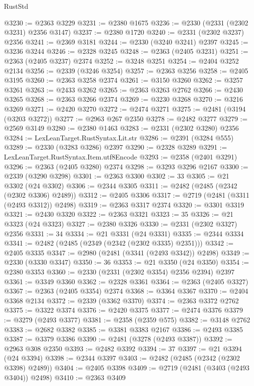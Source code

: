\begin{lexlean}{RustStd}
\begin{coremodule}
@3230 := @2363 @3229
@3231 := @2380 @1675
@3236 := @2330 (@2331 (@2302 @3231) @2356 @3147)
@3237 := @2380 @1720
@3240 := @2331 (@2302 @3237) @2356
@3241 := @2369 @3181
@3244 := @2330 (@3240 @3241) @2397
@3245 := @3236 @3244
@3246 := @2328 @3245
@3248 := @2363 (@2405 @3231)
@3251 := @2363 (@2405 @3237) @2374
@3252 := @3248 @3251
@3254 := @2404 @3252 @2134
@3256 := @2339 (@3246 @3254)
@3257 := @2363 @3256
@3258 := @2405 @3195
@3260 := @2363 @3258 @2374
@3261 := @3150 @3260
@3262 := @3257 @3261
@3263 := @2433 @3262
@3265 := @2363 @3263 @2762
@3266 := @2430 @3265
@3268 := @2363 @3266 @2374
@3269 := @3230 @3268
@3270 := @3216 @3269
@3271 := @2420 @3270
@3272 := @2474 @3271
@3275 := @2481 (@3194 (@3203 @3272))
@3277 := @2963 @267 @2350
@3278 := @2482 @3277
@3279 := @2569 @3149
@3280 := @2380 @1463
@3283 := @2331 (@2302 @3280) @2356
@3284 := LexLeanTarget.RustSyntax.Lit.str
@3286 := @2391 (@3284 @555)
@3289 := @2330 (@3283 @3286) @2397
@3290 := @2328 @3289
@3291 := LexLeanTarget.RustSyntax.Item.utf8Encode
@3293 := @2358 (@2401 @3291)
@3296 := @2363 (@2405 @3280) @2374
@3298 := @3293 @3296 @2167
@3300 := @2339 (@3290 @3298)
@3301 := @2363 @3300
@3302 := 33
@3305 := @21 @3302 (@24 @3302)
@3306 := @2344 @3305
@3311 := @2482 (@2485 (@2342 (@2302 @3306) @2489))
@3312 := @2405 @3306
@3317 := @2719 (@2481 (@3311 (@2493 @3312)) @2498)
@3319 := @2363 @3317 @2374
@3320 := @3301 @3319
@3321 := @2430 @3320
@3322 := @2363 @3321
@3323 := 35
@3326 := @21 @3323 (@24 @3323)
@3327 := @2380 @3326
@3330 := @2331 (@2302 @3327) @2356
@3331 := 34
@3334 := @21 @3331 (@24 @3331)
@3335 := @2344 @3334
@3341 := @2482 (@2485 (@2349 (@2342 (@2302 @3335) @2351)))
@3342 := @2405 @3335
@3347 := @2980 (@2481 (@3341 (@2493 @3342)) @2498)
@3349 := @2330 (@3330 @3347)
@3350 := 36
@3353 := @21 @3350 (@24 @3350)
@3354 := @2380 @3353
@3360 := @2330 (@2331 (@2302 @3354) @2356 @2394) @2397
@3361 := @3349 @3360
@3362 := @2328 @3361
@3364 := @2363 (@2405 @3327)
@3367 := @2363 (@2405 @3354) @2374
@3368 := @3364 @3367
@3370 := @2404 @3368 @2134
@3372 := @2339 (@3362 @3370)
@3374 := @2363 @3372 @2762
@3375 := @3322 @3374
@3376 := @2420 @3375
@3377 := @2474 @3376
@3379 := @3279 (@2493 @3377)
@3381 := @2358 (@2359 @575)
@3382 := @3148 @2762
@3383 := @2682 @3382
@3385 := @3381 @3383 @2167
@3386 := @2493 @3385
@3387 := @3379 @3386
@3390 := @2481 (@3278 (@2493 @3387))
@3392 := @2963 @308 @2350
@3393 := @2482 @3392
@3394 := 37
@3397 := @21 @3394 (@24 @3394)
@3398 := @2344 @3397
@3403 := @2482 (@2485 (@2342 (@2302 @3398) @2489))
@3404 := @2405 @3398
@3409 := @2719 (@2481 (@3403 (@2493 @3404)) @2498)
@3410 := @2363 @3409

\end{coremodule}
\end{lexlean}
